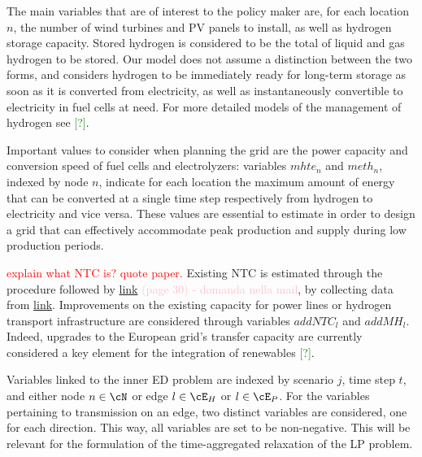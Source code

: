 The main variables that are of interest to the policy maker are, for each location $n$, the number of wind turbines and PV panels to install, as well as hydrogen storage capacity.
Stored hydrogen is considered to be the total of liquid and gas hydrogen to be stored. 
Our model does not assume a distinction between the two forms, and considers hydrogen to be immediately ready for long-term storage as soon as it is converted from electricity, as well as instantaneously convertible to electricity in fuel cells at need. 
For more detailed models of the management of hydrogen see \textcolor{green}{[?]}.

Important values to consider when planning the grid are the power capacity and conversion speed of fuel cells and electrolyzers: variables $mhte_n$ and $meth_n$, indexed by node $n$, indicate for each location the maximum amount of energy that can be converted at a single time step respectively from hydrogen to electricity and vice versa. 
These values are essential to estimate in order to design a grid that can effectively accommodate peak production and supply during low production periods.

\textcolor{red}{explain what NTC is? quote paper.} 
Existing NTC is estimated through the procedure followed by \hyperlink{https://www.diva-portal.org/smash/get/diva2:1476768/FULLTEXT01.pdf}{link} \textcolor{pink}{(page 30) - domanda nella mail}, by collecting data from \hyperlink{https://transparency.entsoe.eu/transmission-domain/physicalFlow/show?name=&defaultValue=false&viewType=TABLE&areaType=BORDER_CTY&atch=false&dateTime.dateTime=22.07.2024+00:00|CET|DAY&border.values=CTY|10YGR-HTSO-----Y!CTY_CTY|10YGR-HTSO-----Y_CTY_CTY|10YIT-GRTN-----B&dateTime.timezone=CET_CEST&dateTime.timezone_input=CET+(UTC+1)+/+CEST+(UTC+2)}{link}. 
Improvements on the existing capacity for power lines or hydrogen transport infrastructure are considered through variables $addNTC_l$ and $addMH_l$.
Indeed, upgrades to the European grid's transfer capacity are currently considered a key element for the integration of renewables \textcolor{green}{[?]}.

Variables linked to the inner ED problem are indexed by scenario \(j\), time step \(t\), and either node \(n \in \cN\) or edge $l\in\cE_H$ or $l \in \cE_P$. 
For the variables pertaining to transmission on an edge, two distinct variables are considered, one for each direction. 
This way, all variables are set to be non-negative. This will be relevant for the formulation of the time-aggregated relaxation of the LP problem.

